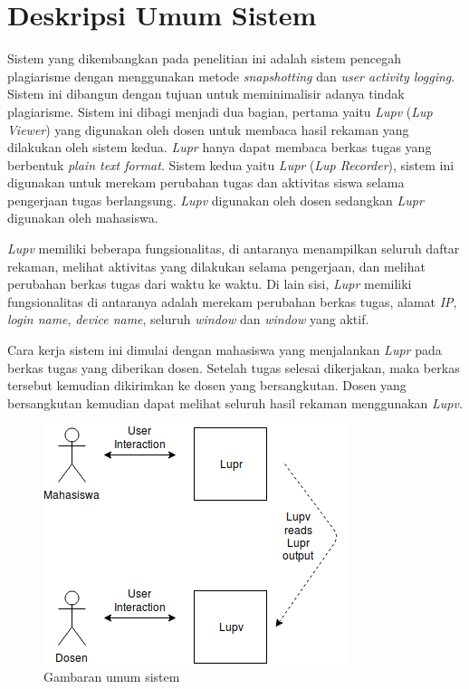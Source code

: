

\section{Deskripsi Umum Sistem}

Sistem yang dikembangkan pada penelitian ini adalah sistem pencegah
plagiarisme dengan menggunakan metode \emph{snapshotting} dan
\emph{user activity logging}. Sistem ini dibangun dengan tujuan untuk
meminimalisir adanya tindak plagiarisme. Sistem ini dibagi menjadi dua
bagian, pertama yaitu \emph{Lupv} (\emph{Lup Viewer}) yang digunakan
oleh dosen untuk membaca hasil rekaman yang dilakukan oleh sistem
kedua. \emph{Lupr} hanya dapat membaca berkas tugas yang berbentuk \emph{plain
  text format}. Sistem kedua yaitu \emph{Lupr} (\emph{Lup Recorder}), sistem
ini digunakan untuk merekam perubahan tugas dan aktivitas siswa selama
pengerjaan tugas berlangsung. \emph{Lupv} digunakan oleh dosen
sedangkan \emph{Lupr} digunakan oleh mahasiswa.

\emph{Lupv} memiliki beberapa fungsionalitas, di antaranya menampilkan
seluruh daftar rekaman, melihat aktivitas yang dilakukan selama
pengerjaan, dan melihat perubahan berkas tugas dari waktu ke
waktu. Di lain sisi, \emph{Lupr} memiliki fungsionalitas di antaranya
adalah merekam perubahan berkas tugas, alamat \emph{IP}, \emph{login
  name}, \emph{device name}, seluruh \emph{window} dan \emph{window} yang aktif.

Cara kerja sistem ini dimulai dengan mahasiswa yang menjalankan
\emph{Lupr} pada berkas tugas yang diberikan dosen. Setelah tugas
selesai dikerjakan, maka berkas tersebut kemudian dikirimkan ke dosen
yang bersangkutan. Dosen yang bersangkutan kemudian dapat melihat
seluruh hasil rekaman menggunakan \emph{Lupv}.


\begin{figure}[tph]
  \centering
  \includegraphics[width=.59\linewidth]{img/deskripsi-sistem}
  \caption{Gambaran umum sistem}\label{fig:deskripsi-sistem}
\end{figure}


